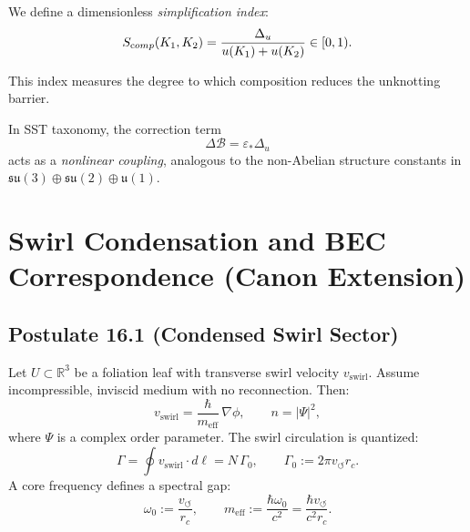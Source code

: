 \documentclass[11pt]{article}
\begin{document}
        We define a dimensionless \emph{simplification index}:
        \[
            S_{\textrm comp}(K_1,K_2)
            = \frac{\Delta_u}{u(K_1)+u(K_2)} \in [0,1).
        \]

        This index measures the degree to which composition
        reduces the unknotting barrier.

        \medskip

        In SST taxonomy, the correction term
        \[
            \Delta\mathcal B = \varepsilon_* \Delta_u
        \]
        acts as a \emph{nonlinear coupling},
        analogous to the non-Abelian structure constants
        in $\mathfrak{su}(3)\oplus\mathfrak{su}(2)\oplus\mathfrak{u}(1)$.




        \section{Swirl Condensation and BEC Correspondence (Canon Extension)}

        \subsection*{Postulate 16.1 (Condensed Swirl Sector)}
            Let $U \subset \mathbb R^3$ be a foliation leaf with transverse swirl velocity $v_{\text{swirl}}$.
            Assume incompressible, inviscid medium with no reconnection. Then:
            \begin{equation}
            v_{\text{swirl}} = \frac{\hbar}{m_{\text{eff}}}\,\nabla \phi,
            \qquad n = |\Psi|^2 ,
            \end{equation}
            where $\Psi$ is a complex order parameter. The swirl circulation is quantized:
            \begin{equation}
            \Gamma = \oint v_{\text{swirl}}\cdot d\ell = N\,\Gamma_0,
            \qquad \Gamma_0 := 2\pi v_\circlearrowleft r_c .
            \end{equation}
            A core frequency defines a spectral gap:
            \begin{equation}
            \omega_0 := \frac{v_\circlearrowleft}{r_c}, \qquad
            m_{\text{eff}} := \frac{\hbar \omega_0}{c^2}
            = \frac{\hbar v_\circlearrowleft}{c^2 r_c}.
            \end{equation}
\end{document}
